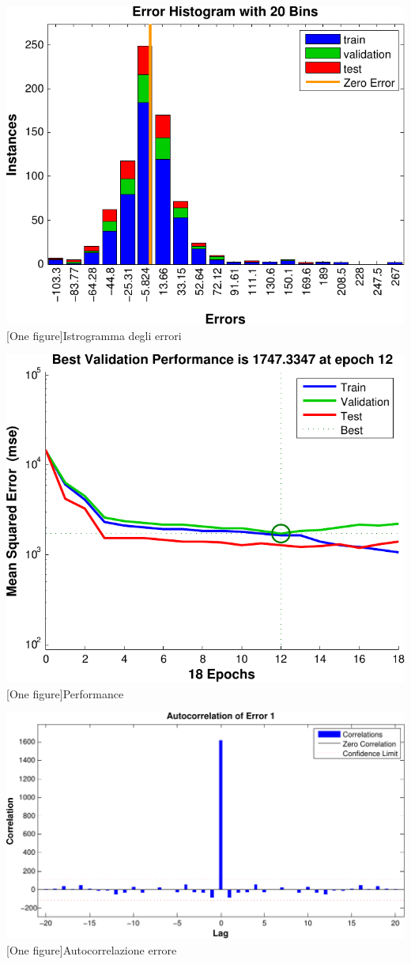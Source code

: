 \includegraphics[scale=0.5]{images/timeseries/energia/histogram.pdf}
[One figure]{Istrogramma degli errori}
\vspace{20px}

\includegraphics[scale=0.5]{images/timeseries/energia/performances.pdf}
[One figure]{Performance}
\vspace{20px}

\includegraphics[scale=0.5]{images/timeseries/energia/autocorrelations.pdf}
[One figure]{Autocorrelazione errore}
\vspace{20px}


